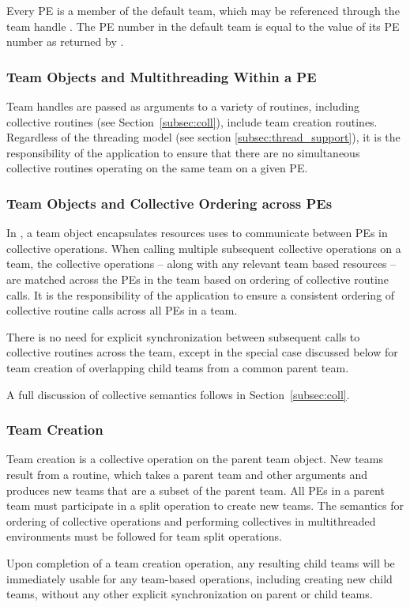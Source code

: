Every \ac{PE} is a member of the default team, which may be referenced
through the team handle .
The \ac{PE} number in the default team is equal to the
value of its \ac{PE} number as returned by .

\subsubsection*{Team Objects and Multithreading Within a \ac{PE}}

Team handles are passed as arguments to a variety of \openshmem routines,
including collective routines (see Section~\ref{subsec:coll}), include team
creation routines.  Regardless of the \openshmem threading model
(see section \ref{subsec:thread_support}), it is the responsibility
of the application to ensure that there are no simultaneous collective
routines operating on the same \openshmem team on a given \ac{PE}.

\subsubsection*{Team Objects and Collective Ordering across \acp{PE}}

In \openshmem, a team object encapsulates resources uses to communicate
between \acp{PE} in collective operations. When calling multiple subsequent
collective operations on a team, the collective operations -- along with any
relevant team based resources -- are matched across the \acp{PE} in the team
based on ordering of collective routine calls. It is the responsibility
of the application to ensure a consistent ordering of collective routine calls
across all \acp{PE} in a team.

There is no need for explicit synchronization between subsequent calls
to collective routines across the team, except in the special case discussed
below for team creation of overlapping child teams from a common parent team.

A full discussion of collective semantics follows in Section~\ref{subsec:coll}.

\subsubsection*{Team Creation}

Team creation is a collective operation on the parent team object. New teams
result from a  routine, which takes a parent team
and other arguments and produces new teams that are a subset of the parent
team. All \acp{PE} in a parent team must participate in a split operation
to create new teams. The semantics for ordering of collective operations
and performing collectives in multithreaded environments must be followed
for team split operations. 

Upon completion of a team creation operation, any resulting child teams will be
immediately usable for any team-based operations, including creating new child teams,
without any other explicit synchronization on parent or child teams.
